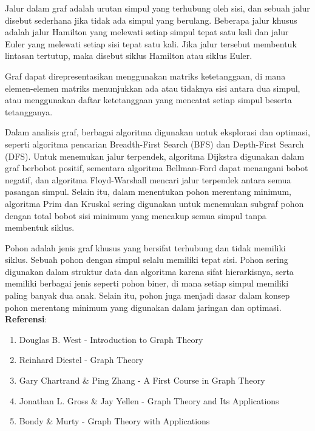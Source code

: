 \documentclass{article}
\begin{document}
Jalur dalam graf adalah urutan simpul yang terhubung oleh sisi, dan sebuah jalur disebut sederhana jika tidak ada simpul yang berulang. Beberapa jalur khusus adalah jalur Hamilton yang melewati setiap simpul tepat satu kali dan jalur Euler yang melewati setiap sisi tepat satu kali. Jika jalur tersebut membentuk lintasan tertutup, maka disebut siklus Hamilton atau siklus Euler.

Graf dapat direpresentasikan menggunakan matriks ketetanggaan, di mana elemen-elemen matriks menunjukkan ada atau tidaknya sisi antara dua simpul, atau menggunakan daftar ketetanggaan yang mencatat setiap simpul beserta tetangganya.

Dalam analisis graf, berbagai algoritma digunakan untuk eksplorasi dan optimasi, seperti algoritma pencarian Breadth-First Search (BFS) dan Depth-First Search (DFS). Untuk menemukan jalur terpendek, algoritma Dijkstra digunakan dalam graf berbobot positif, sementara algoritma Bellman-Ford dapat menangani bobot negatif, dan algoritma Floyd-Warshall mencari jalur terpendek antara semua pasangan simpul. Selain itu, dalam menentukan pohon merentang minimum, algoritma Prim dan Kruskal sering digunakan untuk menemukan subgraf pohon dengan total bobot sisi minimum yang mencakup semua simpul tanpa membentuk siklus.

Pohon adalah jenis graf khusus yang bersifat terhubung dan tidak memiliki siklus. Sebuah pohon dengan  simpul selalu memiliki tepat  sisi. Pohon sering digunakan dalam struktur data dan algoritma karena sifat hierarkisnya, serta memiliki berbagai jenis seperti pohon biner, di mana setiap simpul memiliki paling banyak dua anak. Selain itu, pohon juga menjadi dasar dalam konsep pohon merentang minimum yang digunakan dalam jaringan dan optimasi.\\

\noindent\textbf{Referensi}:
\begin{enumerate}
  \item Douglas B. West - Introduction to Graph Theory
  \item Reinhard Diestel - Graph Theory
  \item Gary Chartrand \& Ping Zhang - A First Course in Graph Theory
  \item Jonathan L. Gross \& Jay Yellen - Graph Theory and Its Applications
  \item Bondy \& Murty - Graph Theory with Applications
\end{enumerate}
\end{document}
